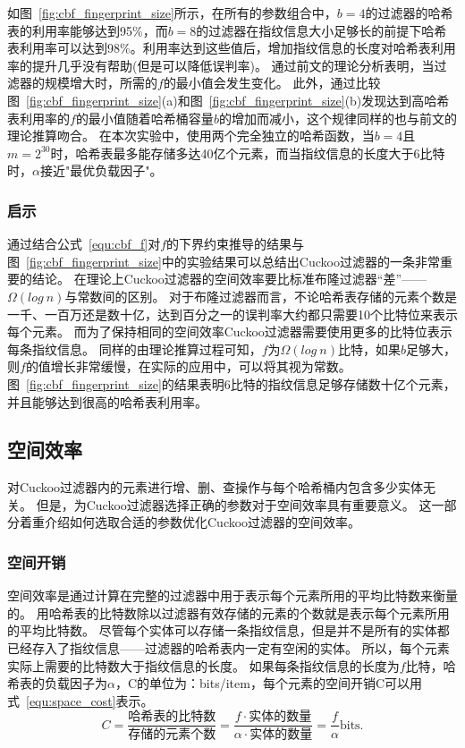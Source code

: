 如图~\ref{fig:cbf_fingerprint_size}所示，在所有的参数组合中，$b = 4$的过滤器的哈希表的利用率能够达到95\%，而$b = 8$的过滤器在指纹信息大小足够长的前提下哈希表利用率可以达到98\%。利用率达到这些值后，增加指纹信息的长度对哈希表利用率的提升几乎没有帮助(但是可以降低误判率)。
通过前文的理论分析表明，当过滤器的规模增大时，所需的$f$的最小值会发生变化。
此外，通过比较图~\ref{fig:cbf_fingerprint_size}(a)和图~\ref{fig:cbf_fingerprint_size}(b)发现达到高哈希表利用率的$f$的最小值随着哈希桶容量$b$的增加而减小，这个规律同样的也与前文的理论推算吻合。
在本次实验中，使用两个完全独立的哈希函数，当$b = 4$且$m = 2^{30}$时，哈希表最多能存储多达40亿个元素，而当指纹信息的长度大于6比特时，$\alpha$接近"最优负载因子"。

\subsubsection{启示}
通过结合公式~\ref{equ:cbf_f}对$f$的下界约束推导的结果与图~\ref{fig:cbf_fingerprint_size}中的实验结果可以总结出Cuckoo过滤器的一条非常重要的结论。
在理论上Cuckoo过滤器的空间效率要比标准布隆过滤器“差”——
$\Omega(log~n)$与常数间的区别。
对于布隆过滤器而言，不论哈希表存储的元素个数是一千、一百万还是数十亿，达到百分之一的误判率大约都只需要10个比特位来表示每个元素。
而为了保持相同的空间效率Cuckoo过滤器需要使用更多的比特位表示每条指纹信息。
同样的由理论推算过程可知，$f$为$\Omega(log~n)$比特，如果$b$足够大，则$f$的值增长非常缓慢，在实际的应用中，可以将其视为常数。
图~\ref{fig:cbf_fingerprint_size}的结果表明6比特的指纹信息足够存储数十亿个元素，并且能够达到很高的哈希表利用率。

\subsection{空间效率}
\label{sec:space_ef}
对Cuckoo过滤器内的元素进行增、删、查操作与每个哈希桶内包含多少实体无关。
但是，为Cuckoo过滤器选择正确的参数对于空间效率具有重要意义。
这一部分着重介绍如何选取合适的参数优化Cuckoo过滤器的空间效率。

\subsubsection{空间开销}
空间效率是通过计算在完整的过滤器中用于表示每个元素所用的平均比特数来衡量的。
用哈希表的比特数除以过滤器有效存储的元素的个数就是表示每个元素所用的平均比特数。
尽管每个实体可以存储一条指纹信息，但是并不是所有的实体都已经存入了指纹信息——过滤器的哈希表内一定有空闲的实体。
所以，每个元素实际上需要的比特数大于指纹信息的长度。
如果每条指纹信息的长度为$f$比特，哈希表的负载因子为$\alpha$，C的单位为：bits/item，每个元素的空间开销C可以用式~\ref{equ:space_cost}表示。
\begin{equation}
C = \frac{\text{哈希表的比特数}}{\text{存储的元素个数}} = \frac{f\cdot \text{实体的数量}}{\alpha \cdot \text{实体的数量}} = \frac{f}{\alpha} \text{bits.}
\label{equ:space_cost}
\end{equation}


